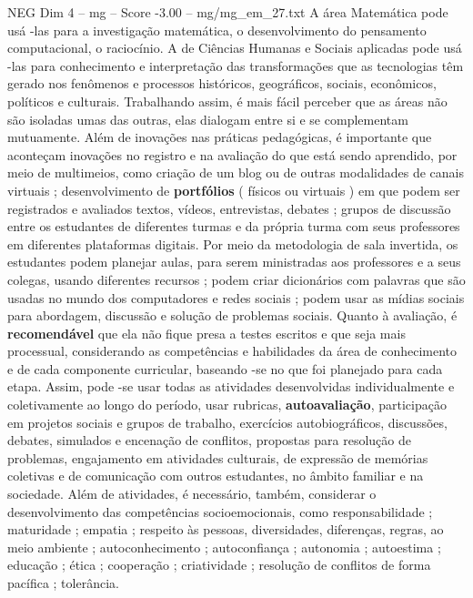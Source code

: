 \begin{textsample}{NEG Dim 4 – mg – Score -3.00 – mg/mg\_em\_27.txt}
A área Matemática pode usá -las para a investigação matemática, o desenvolvimento do pensamento computacional, o raciocínio.
A de Ciências Humanas e Sociais aplicadas pode usá -las para conhecimento e interpretação das transformações que as tecnologias têm gerado nos fenômenos e processos históricos, geográficos, sociais, econômicos, políticos e culturais.
Trabalhando assim, é mais fácil perceber que as áreas não são isoladas umas das outras, elas dialogam entre si e se complementam mutuamente.
Além de inovações nas práticas pedagógicas, é importante que aconteçam inovações no registro e na avaliação do que está sendo aprendido, por meio de multimeios, como criação de um blog ou de outras modalidades de canais virtuais ; desenvolvimento de \textbf{portfólios} ( físicos ou virtuais ) em que podem ser registrados e avaliados textos, vídeos, entrevistas, debates ; grupos de discussão entre os estudantes de diferentes turmas e da própria turma com seus professores em diferentes plataformas digitais.
Por meio da metodologia de sala invertida, os estudantes podem planejar aulas, para serem ministradas aos professores e a seus colegas, usando diferentes recursos ; podem criar dicionários com palavras que são usadas no mundo dos computadores e redes sociais ; podem usar as mídias sociais para abordagem, discussão e solução de problemas sociais.
Quanto à avaliação, é \textbf{recomendável} que ela não fique presa a testes escritos e que seja mais processual, considerando as competências e habilidades da área de conhecimento e de cada componente curricular, baseando -se no que foi planejado para cada etapa.
Assim, pode -se usar todas as atividades desenvolvidas individualmente e coletivamente ao longo do período, usar rubricas, \textbf{autoavaliação}, participação em projetos sociais e grupos de trabalho, exercícios autobiográficos, discussões, debates, simulados e encenação de conflitos, propostas para resolução de problemas, engajamento em atividades culturais, de expressão de memórias coletivas e de comunicação com outros estudantes, no âmbito familiar e na sociedade.
Além de atividades, é necessário, também, considerar o desenvolvimento das competências socioemocionais, como responsabilidade ; maturidade ; empatia ; respeito às pessoas, diversidades, diferenças, regras, ao meio ambiente ; autoconhecimento ; autoconfiança ; autonomia ; autoestima ; educação ; ética ; cooperação ; criatividade ; resolução de conflitos de forma pacífica ; tolerância.

\end{textsample}
